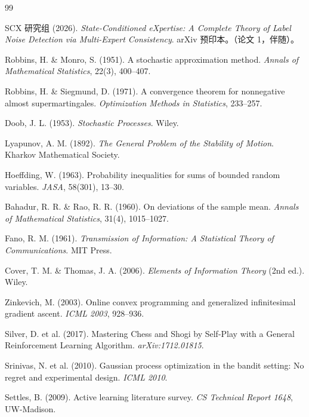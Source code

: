 \begin{thebibliography}{99}

SCX 研究组 (2026).
\emph{State-Conditioned eXpertise: A Complete Theory of Label Noise Detection via Multi-Expert Consistency}.
arXiv 预印本。（论文 1，伴随）。

Robbins, H. \& Monro, S. (1951).
A stochastic approximation method.
\emph{Annals of Mathematical Statistics}, 22(3), 400--407.

Robbins, H. \& Siegmund, D. (1971).
A convergence theorem for nonnegative almost supermartingales.
\emph{Optimization Methods in Statistics}, 233--257.

Doob, J. L. (1953).
\emph{Stochastic Processes}. Wiley.

Lyapunov, A. M. (1892).
\emph{The General Problem of the Stability of Motion}.
Kharkov Mathematical Society.

Hoeffding, W. (1963).
Probability inequalities for sums of bounded random variables.
\emph{JASA}, 58(301), 13--30.

Bahadur, R. R. \& Rao, R. R. (1960).
On deviations of the sample mean.
\emph{Annals of Mathematical Statistics}, 31(4), 1015--1027.

Fano, R. M. (1961).
\emph{Transmission of Information: A Statistical Theory of Communications}. MIT Press.

Cover, T. M. \& Thomas, J. A. (2006).
\emph{Elements of Information Theory} (2nd ed.). Wiley.

Zinkevich, M. (2003).
Online convex programming and generalized infinitesimal gradient ascent.
\emph{ICML 2003}, 928--936.

Silver, D. et al. (2017).
Mastering Chess and Shogi by Self-Play with a General Reinforcement Learning Algorithm.
\emph{arXiv:1712.01815}.

Srinivas, N. et al. (2010).
Gaussian process optimization in the bandit setting: No regret and experimental design.
\emph{ICML 2010}.

Settles, B. (2009).
Active learning literature survey.
\emph{CS Technical Report 1648}, UW-Madison.


\end{thebibliography}
